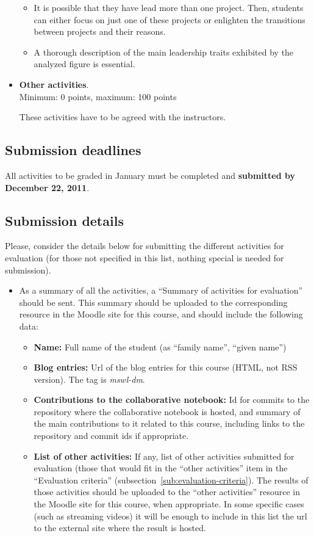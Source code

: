 \documentclass[a4paper]{article}
\begin{document}
\begin{itemize}
\begin{itemize}
   \item It is possible that they have lead more than one project. Then, students can either focus on just
   one of these projects or enlighten the transitions between projects and their reasons.
   \item A thorough description of the main leadership traits exhibited by the analyzed figure is essential.
  \end{itemize}


\item \textbf{Other activities}. \\
  Minimum: 0 points, maximum: 100 points

  These activities have to be agreed with the instructors.
\end{itemize}

\subsection{Submission deadlines}

All activities to be graded in January must be completed and \textbf{submitted by December 22, 2011}.

\subsection{Submission details}

Please, consider the details below for submitting the different activities for evaluation (for those not specified in this list, nothing special is needed for submission).

\begin{itemize}
\item As a summary of all the activities, a ``Summary of activities for evaluation'' should be sent. This summary should be uploaded to the corresponding resource in the Moodle site for this course, and should include the following data:
  \begin{itemize}
  \item \textbf{Name:} Full name of the student (as ``family name'', ``given name'')
  \item \textbf{Blog entries:} Url of the blog entries for this course (HTML, not RSS version). The tag is \textit{mswl-dm}.
  \item \textbf{Contributions to the collaborative notebook:} Id for commits to the repository where the collaborative notebook is hosted, and summary of the main contributions to it related to this course, including links to the repository and commit ids if appropriate.
  \item \textbf{List of other activities:} If any, list of other activities submitted for evaluation (those that would fit in the ``other activities'' item in the ``Evaluation criteria'' (subsection~\ref{sub:evaluation-criteria}). The results of those activities should be uploaded to the ``other activities'' resource in the Moodle site for this course, when appropriate. In some specific cases (such as streaming videos) it will be enough to include in this list the url to the external site where the result is hosted.
  \end{itemize}
\end{itemize}
\end{document}
